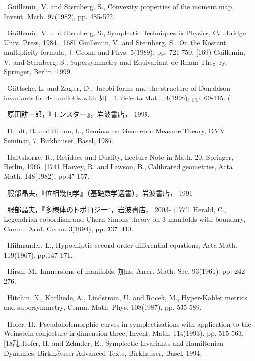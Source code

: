 {\noindent [166]\ Guillemin, V. and Sternberg, S., Convexity properties of the moment map, Invent. Math. 97(1982), pp. 485-522.\par\smallskip
\noindent [167]\ Guillemin, V. and Sternberg, S., Symplectic Techniques in Physics, Cambridge Univ. Press, 1984. [1681 Guillemin, V. and Sternberg, S., On the Kostant multiplicity formula, J. Geom. and Phys. 5(1989), pp. 721-750. [169) Guillemin, V. and Sternberg, S., Supersymmetry and Equivariant de Rham The。ry, Springer, Berlin, 1999.\par\smallskip
\noindent [170]\ Giittsche, L. and Zagier, D., Jacobi forms and the structure of Donaldson invariants for 4-manifolds with 如= 1, Selecta Math. 4(1998), pp. 69-115. (\par\smallskip
\noindent [171]\ 原田耕一郎，『モンスター』，岩波書店， 1999.\par\smallskip
\noindent [172]\ Hardt, R. and Simon, L., Seminar on Geometric Measure Theory, DMV Seminar, 7, Birkhauser, Basel, 1986.\par\smallskip
\noindent [173]\ Hartshorne, R., Residues and Duality, Lecture Note in Math. 20, Springer, Berlin, 1966. [1741 Harvey, R. and Lawson, B., Calibrated geometries, Acta Math. 148(1982), pp.47-157.\par\smallskip
\noindent [175]\ 服部晶夫，『位相幾何学』（基礎数学選書），岩波書店， 1991-\par\smallskip
\noindent [176]\ 服部晶夫，『多様体のトポロジ一』，岩波書店， 2003- [177'1 Herald, C., Legendrian cobordism and Chern-Simons theory on 3-manifolds with boundary, Comm. Anal. Geom. 3(1994), pp. 337--413.\par\smallskip
\noindent [178]\ Hiilmander, L., Hypoelliptic second order differential equations, Acta Math. 119(1967), pp.147-171.\par\smallskip
\noindent [179]\ Hirsh, M., Immersions of manifolds, 加ns. Amer. Math. Soc. 93(1961), pp. 242-276.\par\smallskip
\noindent [180]\ Hitchin, N., Karlhede, A., Lindstrom, U. and Rocek, M., Hyper-Kahler metrics and supersymmetry, Comm. Math. Phys. 108(1987), pp. 535-589.\par\smallskip
\noindent [181]\ Hofer, H., Pseudoholomorphic curves in symplectisations with application to the Weinstein conjecture in dimension three, Invent. Math. 114(1993), pp. 515-563. [18乱 Hofer, H. and Zehnder, E., Symplectic Invariants and Hamiltonian Dynamics, Birkhふuser Advanced Texts, Birkhauser, Basel, 1994.\par\smallskip
}

